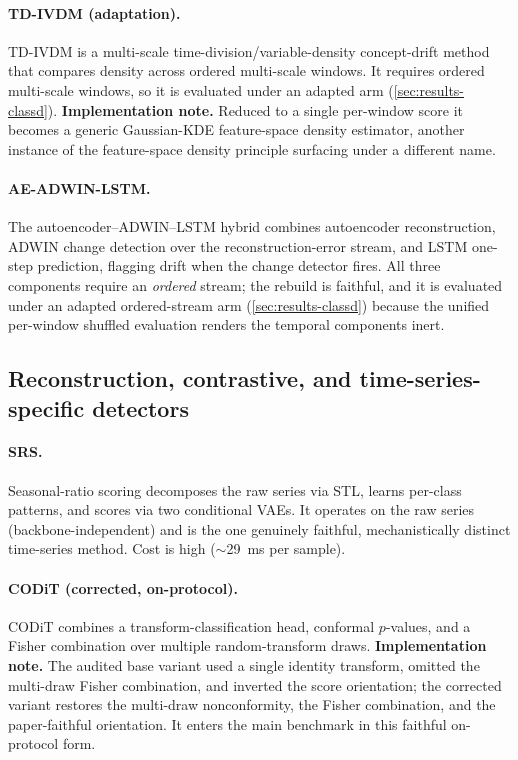 \documentclass[11pt]{article}
\begin{document}
\paragraph{TD-IVDM (adaptation).}
TD-IVDM \citep{TDIVDM2025} is a multi-scale time-division/variable-density
concept-drift method that compares density across ordered multi-scale windows. It
requires ordered multi-scale windows, so it is evaluated under an adapted arm
(\cref{sec:results-classd}). \textbf{Implementation note.} Reduced to a single
per-window score it becomes a generic Gaussian-KDE feature-space density estimator,
another instance of the feature-space density principle surfacing under a different
name.

\paragraph{AE-ADWIN-LSTM.}
The autoencoder--ADWIN--LSTM hybrid \citep{AEADWINLSTM2025} combines autoencoder
reconstruction, ADWIN change detection over the reconstruction-error stream, and LSTM
one-step prediction, flagging drift when the change detector fires. All three
components require an \emph{ordered} stream; the rebuild is faithful, and it is
evaluated under an adapted ordered-stream arm (\cref{sec:results-classd}) because the
unified per-window shuffled evaluation renders the temporal components inert.

\subsection{Reconstruction, contrastive, and time-series-specific detectors}\label{sec:m-ts}

\paragraph{SRS.}
Seasonal-ratio scoring \citep{Belkhouja2023} decomposes the raw series via STL,
learns per-class patterns, and scores via two conditional VAEs. It operates on the
raw series (backbone-independent) and is the one genuinely faithful, mechanistically
distinct time-series method. Cost is high ($\sim$\SI{29}{\milli\second} per sample).

\paragraph{CODiT (corrected, on-protocol).}
CODiT \citep{Kaur2023} combines a transform-classification head, conformal
$p$-values, and a Fisher combination over multiple random-transform draws.
\textbf{Implementation note.} The audited base variant used a single identity
transform, omitted the multi-draw Fisher combination, and inverted the score
orientation; the corrected variant restores the multi-draw nonconformity, the Fisher
combination, and the paper-faithful orientation. It enters the main benchmark in this
faithful on-protocol form.
\end{document}

